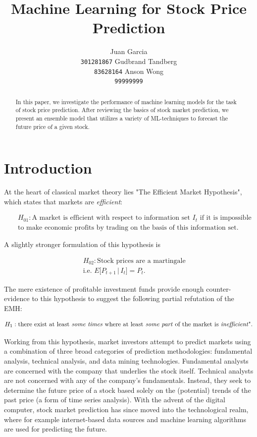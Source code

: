 \documentclass{article}
\title{Machine Learning for Stock Price Prediction}
\author{
 Juan Garcia\\
 \texttt{301281867}
 \And
 Gudbrand Tandberg \\
\texttt{83628164}
 \And
 Anson Wong\\
 \texttt{99999999}
 }
\begin{document}
\maketitle

\begin{abstract}
In this paper, we investigate the performance of machine learning models for the task of stock price prediction. After reviewing the basics of stock market prediction, we present an ensemble model that utilizes a variety of ML-techniques to forecast the future price of a given stock.
\end{abstract}

\section{Introduction}
At the heart of classical market theory lies "The Efficient Market Hypothesis", which states that markets are \emph{efficient}:

\begin{eqnarray*}
&&H_{01}: \text{A market is efficient with respect to information set $I_t$ if it is impossible}\\
&&\text{to make economic profits by trading on the basis of this information set.}
\end{eqnarray*}

A slightly stronger formulation of this hypothesis is 

\begin{eqnarray*}
&&H_{02}: \text{Stock prices are a martingale}\\
&&\text{i.e. } E\lbrack P_{t+1} \,|\, I_t\rbrack = P_t.
\end{eqnarray*}

The mere existence of profitable investment funds provide enough counter-evidence to this hypothesis to suggest the following partial refutation of the EMH: 

\begin{eqnarray*}
H_{1}: \text{there exist at least \emph{some times} where at least \emph{some part} of the market is \emph{inefficient}".}
\end{eqnarray*}

Working from this hypothesis, market investors attempt to predict markets using a combination of three broad categories of prediction methodologies: fundamental analysis, technical analysis, and data mining technologies. Fundamental analysts are concerned with the company that underlies the stock itself. Technical analysts are not concerned with any of the company's fundamentals. Instead, they seek to determine the future price of a stock based solely on the (potential) trends of the past price (a form of time series analysis). With the advent of the digital computer, stock market prediction has since moved into the technological realm, where for example internet-based data sources and machine learning algorithms are used for predicting the future. 
\end{document}
